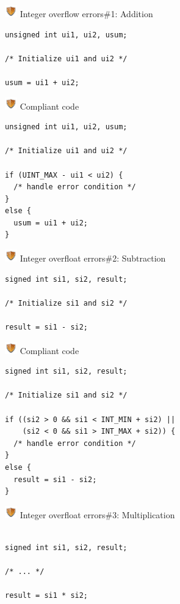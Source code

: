 \documentclass{beamer}
\newcommand{\shield}{\includegraphics[width=15pt]{shield.png} \hspace*{5pt}}
\begin{document}
\begin{frame}[fragile]{\shield Integer overflow errors\#1: Addition}
\begin{lstlisting}[style=cstyle]
unsigned int ui1, ui2, usum;
 
/* Initialize ui1 and ui2 */
 
usum = ui1 + ui2;

\end{lstlisting}
\end{frame}

\begin{frame}[fragile]{\shield Compliant code}
\begin{lstlisting}[style=cstyle]
unsigned int ui1, ui2, usum;
 
/* Initialize ui1 and ui2 */
 
if (UINT_MAX - ui1 < ui2) {
  /* handle error condition */
}
else {
  usum = ui1 + ui2;
}
\end{lstlisting}
\end{frame}

\begin{frame}[fragile]{\shield Integer overfloat errors\#2: Subtraction}
\begin{lstlisting}[style=cstyle]
signed int si1, si2, result;
 
/* Initialize si1 and si2 */
 
result = si1 - si2;

\end{lstlisting}
\end{frame}

\begin{frame}[fragile]{\shield Compliant code}
\begin{lstlisting}[style=cstyle]
signed int si1, si2, result;
 
/* Initialize si1 and si2 */
 
if ((si2 > 0 && si1 < INT_MIN + si2) ||
    (si2 < 0 && si1 > INT_MAX + si2)) {
  /* handle error condition */
}
else {
  result = si1 - si2;
}
\end{lstlisting}
\end{frame}

\begin{frame}[fragile]{\shield Integer overfloat errors\#3: Multiplication}
\begin{lstlisting}[style=cstyle]

signed int si1, si2, result;
 
/* ... */
 
result = si1 * si2;
\end{lstlisting}
\end{frame}
\end{document}
